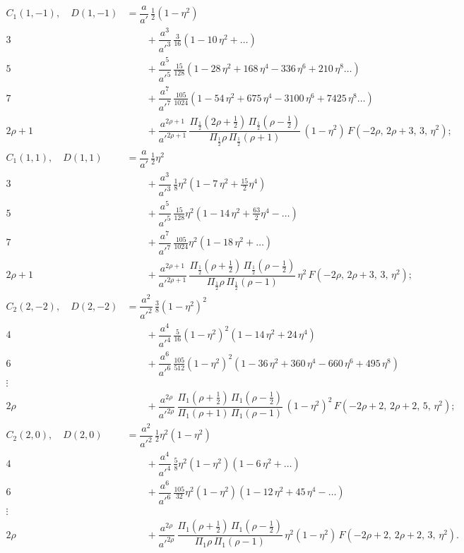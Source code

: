 \documentclass[12pt,a4paper]{article}
\theoremstyle{plain}
\begin{document}
\newpage
{}
\begin{align*}
C_{1}(1,-1),\quad D(1,-1) &= \dfrac{a}{a'}\,\tfrac{1}{2}(1-\eta^{2})\\
3 &\qquad +\dfrac{a^{3}}{a'^{3}}\,\tfrac{3}{16}(1-10\,\eta^{2}+\ldots)\\
5 &\qquad +\dfrac{a^{5}}{a'^{5}}\,\tfrac{15}{128}(1-28\,\eta^{2}+168\,\eta^{4}-336\,\eta^{6}+210\,\eta^{8}\ldots)\\
7 &\qquad +\dfrac{a^{7}}{a'^{7}}\,\tfrac{105}{1024}(1-54\,\eta^{2}+675\,\eta^{4}-3100\,\eta^{6}+7425\,\eta^{8}\ldots)\\
2\rho+1 &\qquad +\dfrac{a^{2\rho+1}}{a'^{2\rho+1}}\,\dfrac{\Pi_{\frac{1}{2}}(2\rho+\tfrac{1}{2})\,\Pi_{\frac{1}{2}}(\rho-\tfrac{1}{2})}{\Pi_{\frac{1}{2}}\rho\,\Pi_{\frac{1}{2}}(\rho+1)}\,(1-\eta^{2})\,F(-2\rho,\,2\rho+3,\,3,\,\eta^{2});\\[1em]
C_{1}(1,1),\quad D(1,1) &= \dfrac{a}{a'}\,\tfrac{1}{2}\eta^{2}\\
3 &\qquad +\dfrac{a^{3}}{a'^{3}}\,\tfrac{1}{8}\eta^{2}(1-7\,\eta^{2}+\tfrac{15}{2}\eta^{4})\\
5 &\qquad +\dfrac{a^{5}}{a'^{5}}\,\tfrac{15}{128}\eta^{2}(1-14\,\eta^{2}+\tfrac{63}{2}\eta^{4}-\ldots)\\
7 &\qquad +\dfrac{a^{7}}{a'^{7}}\,\tfrac{105}{1024}\eta^{2}(1-18\,\eta^{2}+\ldots)\\
2\rho+1 &\qquad +\dfrac{a^{2\rho+1}}{a'^{2\rho+1}}\,\dfrac{\Pi_{\frac{1}{2}}(\rho+\tfrac{1}{2})\,\Pi_{\frac{1}{2}}(\rho-\tfrac{1}{2})}{\Pi_{\frac{1}{2}}\rho\,\Pi_{\frac{1}{2}}(\rho-1)}\,\eta^{2}\,F(-2\rho,\,2\rho+3,\,3,\,\eta^{2});\\[1em]
C_{2}(2,-2),\quad D(2,-2) &= \dfrac{a^{2}}{a'^{2}}\,\tfrac{3}{8}(1-\eta^{2})^{2}\\
4 &\qquad +\dfrac{a^{4}}{a'^{4}}\,\tfrac{5}{16}(1-\eta^{2})^{2}(1-14\,\eta^{2}+24\,\eta^{4})\\
6 &\qquad +\dfrac{a^{6}}{a'^{6}}\,\tfrac{105}{512}(1-\eta^{2})^{2}(1-36\,\eta^{2}+360\,\eta^{4}-660\,\eta^{6}+495\,\eta^{8})\\
\vdots &\\
2\rho &\qquad +\dfrac{a^{2\rho}}{a'^{2\rho}}\,\dfrac{\Pi_{1}(\rho+\tfrac{1}{2})\,\Pi_{1}(\rho-\tfrac{1}{2})}{\Pi_{1}(\rho+1)\,\Pi_{1}(\rho-1)}\,(1-\eta^{2})^{2}\,F(-2\rho+2,\,2\rho+2,\,5,\,\eta^{2});\\[1em]
C_{2}(2,0),\quad D(2,0) &= \dfrac{a^{2}}{a'^{2}}\,\tfrac{1}{2}\eta^{2}(1-\eta^{2})\\
4 &\qquad +\dfrac{a^{4}}{a'^{4}}\,\tfrac{5}{8}\eta^{2}(1-\eta^{2})(1-6\,\eta^{2}+\ldots)\\
6 &\qquad +\dfrac{a^{6}}{a'^{6}}\,\tfrac{105}{32}\eta^{2}(1-\eta^{2})(1-12\,\eta^{2}+45\,\eta^{4}-\ldots)\\
\vdots &\\
2\rho &\qquad +\dfrac{a^{2\rho}}{a'^{2\rho}}\,\dfrac{\Pi_{1}(\rho+\tfrac{1}{2})\,\Pi_{1}(\rho-\tfrac{1}{2})}{\Pi_{1}\rho\,\Pi_{1}(\rho-1)}\,\eta^{2}(1-\eta^{2})\,F(-2\rho+2,\,2\rho+2,\,3,\,\eta^{2}).
\end{align*}
\end{document}
